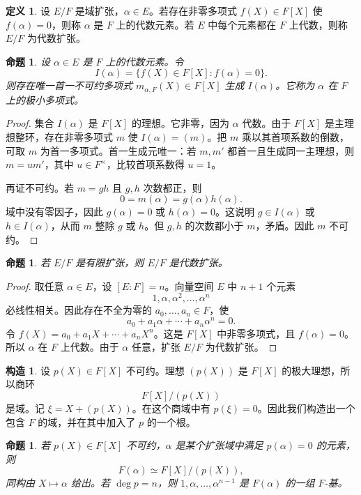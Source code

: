 \documentclass[11pt,a4paper,openany]{ctexbook}
\numberwithin{equation}{chapter}
\theoremstyle{plain}
\newtheorem{proposition}[theorem]{命题}
\theoremstyle{definition}
\newtheorem{definition}[theorem]{定义}
\newtheorem{construction}[theorem]{构造}
\theoremstyle{remark}
\begin{document}
\begin{definition}
设 $E/F$ 是域扩张，$\alpha\in E$。若存在非零多项式 $f(X)\in F[X]$ 使 $f(\alpha)=0$，则称 $\alpha$ 是 $F$ 上的代数元素。若 $E$ 中每个元素都在 $F$ 上代数，则称 $E/F$ 为代数扩张。
\end{definition}

\begin{proposition}
设 $\alpha\in E$ 是 $F$ 上的代数元素。令
\[
I(\alpha)=\{f(X)\in F[X]:f(\alpha)=0\}.
\]
则存在唯一首一不可约多项式 $m_{\alpha,F}(X)\in F[X]$ 生成 $I(\alpha)$。它称为 $\alpha$ 在 $F$ 上的极小多项式。
\end{proposition}

\begin{proof}
集合 $I(\alpha)$ 是 $F[X]$ 的理想。它非零，因为 $\alpha$ 代数。由于 $F[X]$ 是主理想整环，存在非零多项式 $m$ 使 $I(\alpha)=(m)$。把 $m$ 乘以其首项系数的倒数，可取 $m$ 为首一多项式。首一生成元唯一：若 $m,m'$ 都首一且生成同一主理想，则 $m=um'$，其中 $u\in F^\times$，比较首项系数得 $u=1$。

再证不可约。若 $m=gh$ 且 $g,h$ 次数都正，则
\[
0=m(\alpha)=g(\alpha)h(\alpha).
\]
域中没有零因子，因此 $g(\alpha)=0$ 或 $h(\alpha)=0$。这说明 $g\in I(\alpha)$ 或 $h\in I(\alpha)$，从而 $m$ 整除 $g$ 或 $h$。但 $g,h$ 的次数都小于 $m$，矛盾。因此 $m$ 不可约。
\end{proof}

\begin{proposition}
若 $E/F$ 是有限扩张，则 $E/F$ 是代数扩张。
\end{proposition}

\begin{proof}
取任意 $\alpha\in E$，设 $[E:F]=n$。向量空间 $E$ 中 $n+1$ 个元素
\[
1,\alpha,\alpha^2,\dots,\alpha^n
\]
必线性相关。因此存在不全为零的 $a_0,\dots,a_n\in F$，使
\[
a_0+a_1\alpha+\cdots+a_n\alpha^n=0.
\]
令 $f(X)=a_0+a_1X+\cdots+a_nX^n$。这是 $F[X]$ 中非零多项式，且 $f(\alpha)=0$。所以 $\alpha$ 在 $F$ 上代数。由于 $\alpha$ 任意，扩张 $E/F$ 为代数扩张。
\end{proof}

\begin{construction}
设 $p(X)\in F[X]$ 不可约。理想 $(p(X))$ 是 $F[X]$ 的极大理想，所以商环
\[
F[X]/(p(X))
\]
是域。记 $\xi=X+(p(X))$。在这个商域中有 $p(\xi)=0$。因此我们构造出一个包含 $F$ 的域，并在其中加入了 $p$ 的一个根。
\end{construction}

\begin{proposition}
若 $p(X)\in F[X]$ 不可约，$\alpha$ 是某个扩张域中满足 $p(\alpha)=0$ 的元素，则
\[
F(\alpha)\simeq F[X]/(p(X)),
\]
同构由 $X\mapsto\alpha$ 给出。若 $\deg p=n$，则 $1,\alpha,\ldots,\alpha^{n-1}$ 是 $F(\alpha)$ 的一组 $F$-基。
\end{proposition}
\end{document}
